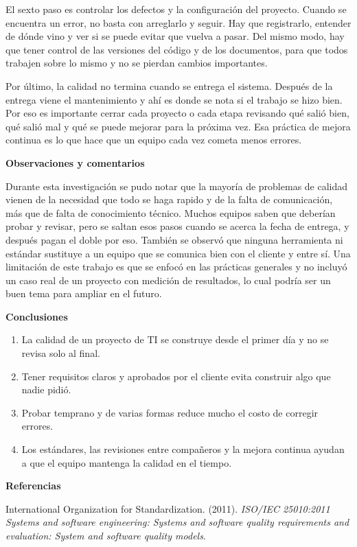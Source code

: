 \documentclass[12pt,letterpaper]{article}
\begin{document}
El sexto paso es controlar los defectos y la configuración del proyecto. Cuando se encuentra un error, no basta con arreglarlo y seguir. Hay que registrarlo, entender de dónde vino y ver si se puede evitar que vuelva a pasar. Del mismo modo, hay que tener control de las versiones del código y de los documentos, para que todos trabajen sobre lo mismo y no se pierdan cambios importantes.

Por último, la calidad no termina cuando se entrega el sistema. Después de la entrega viene el mantenimiento y ahí es donde se nota si el trabajo se hizo bien. Por eso es importante cerrar cada proyecto o cada etapa revisando qué salió bien, qué salió mal y qué se puede mejorar para la próxima vez. Esa práctica de mejora continua es lo que hace que un equipo cada vez cometa menos errores.

\textbf{Observaciones y comentarios}

Durante esta investigación se pudo notar que la mayoría de problemas de calidad vienen de la necesidad que todo se haga rapido y de la falta de comunicación, más que de falta de conocimiento técnico. Muchos equipos saben que deberían probar y revisar, pero se saltan esos pasos cuando se acerca la fecha de entrega, y después pagan el doble por eso. También se observó que ninguna herramienta ni estándar sustituye a un equipo que se comunica bien con el cliente y entre sí. Una limitación de este trabajo es que se enfocó en las prácticas generales y no incluyó un caso real de un proyecto con medición de resultados, lo cual podría ser un buen tema para ampliar en el futuro.

\textbf{Conclusiones}

\begin{enumerate}[label=\arabic*.]
\item La calidad de un proyecto de TI se construye desde el primer día y no se revisa solo al final.
\item Tener requisitos claros y aprobados por el cliente evita construir algo que nadie pidió.
\item Probar temprano y de varias formas reduce mucho el costo de corregir errores.
\item Los estándares, las revisiones entre compañeros y la mejora continua ayudan a que el equipo mantenga la calidad en el tiempo.
\end{enumerate}

\textbf{Referencias}

International Organization for Standardization. (2011). \textit{ISO/IEC 25010:2011 Systems and software engineering: Systems and software quality requirements and evaluation: System and software quality models}.
\end{document}
